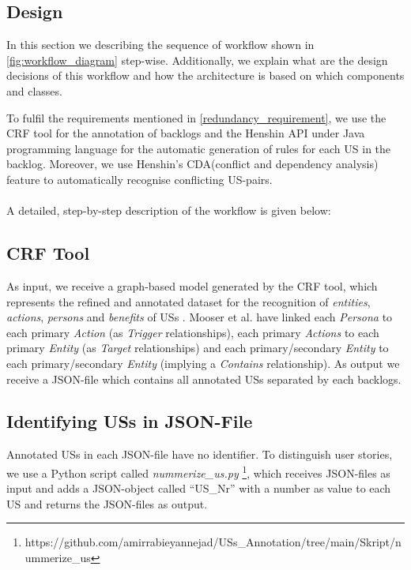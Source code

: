 \subsection{Design}\label{desing}
In this section we describing the sequence of workflow shown in \ref{fig:workflow_diagram} step-wise. Additionally, we explain what are the design decisions of this workflow and how the architecture is based on which components and classes.

To fulfil the requirements mentioned in \ref{redundancy_requirement}, we use the CRF tool \cite{mosser2022modelling} for the annotation of backlogs and the Henshin API \cite{arendt2010henshin} under Java programming language for the automatic generation of rules for each US in the backlog. Moreover, we use Henshin's CDA(conflict and dependency analysis) feature \cite{mens2007analysing} to automatically recognise conflicting US-pairs.\\\\
A detailed, step-by-step description of the workflow is given below:
\subsection*{CRF Tool}\label{workflow_crf}
As input, we receive a graph-based model generated by the CRF tool, which represents the refined and annotated dataset for the recognition of \emph{entities}, \emph{actions}, \emph{persons} and \emph{benefits} of USs \cite{mosser2022modelling}. Mooser et al. have linked each \emph{Persona} to each primary \emph{Action} (as \emph{Trigger} relationships), each primary \emph{Actions} to each primary \emph{Entity} (as \emph{Target} relationships) and each primary/secondary \emph{Entity} to each primary/secondary \emph{Entity} (implying a \emph{Contains} relationship)\cite{arulmohan2023extracting}. As output we receive a JSON-file which contains all annotated USs separated by each backlogs.
\subsection*{Identifying USs in JSON-File}\label{workflow_nummerize_us}
Annotated USs in each JSON-file have no identifier. To distinguish user stories, we use a Python script called \textit{nummerize\_us.py} \footnote{https://github.com/amirrabieyannejad/USs\_Annotation/tree/main/Skript/nummerize\_us}, which receives JSON-files as input and adds a JSON-object called \enquote{US\_Nr} with a number as value to each US and returns the JSON-files as output.
